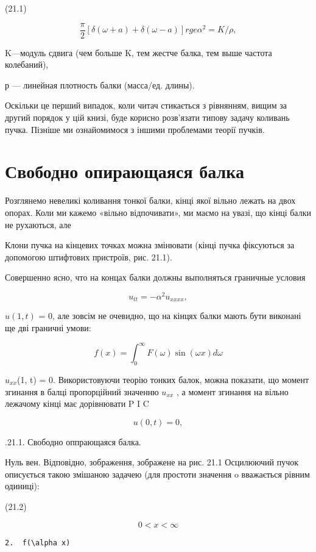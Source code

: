 \documentclass[
  ukrainian,
]{article}
\begin{document}
(21.1)

\[
\frac{\pi}{2} [\delta(\omega+a) + \delta(\omega-a)]
rge  \alpha^2 = K/\rho  ,
\]

K---модуль сдвига (чем больше K, тем жестче балка, тем выше частота
колебаний),

р --- линейная плотность балки (масса/ед. длины).

Оскільки це перший випадок, коли читач стикається з рівнянням, вищим за
другий порядок у цій книзі, буде корисно розв'язати типову задачу
коливань пучка. Пізніше ми ознайомимося з іншими проблемами теорії
пучків.

\section{Свободно опирающаяся
балка}\label{ux441ux432ux43eux431ux43eux434ux43dux43e-ux43eux43fux438ux440ux430ux44eux449ux430ux44fux441ux44f-ux431ux430ux43bux43aux430}

Розглянемо невеликі коливання тонкої балки, кінці якої вільно лежать на
двох опорах. Коли ми кажемо «вільно відпочивати», ми маємо на увазі, що
кінці балки не рухаються, але

Клони пучка на кінцевих точках можна змінювати (кінці пучка фіксуються
за допомогою штифтових пристроїв, рис. 21.1).

Совершенно ясно, что на концах балки должны выполняться граничные
условия

\[
u_{tt} = -\alpha^2 u_{xxxx},
\]

\(u(1, t)\) = 0, але зовсім не очевидно, що на кінцях балки мають бути
виконані ще дві граничні умови:

\[
f(x) = \int_{0}^{\infty} F(\omega) \sin(\omega x) d\omega
\]

\(u_{xx}\)(1, t) = 0. Використовуючи теорію тонких балок, можна
показати, що момент згинання в балці пропорційний значенню \(u_{xx}\) ,
а момент згинання на вільно лежачому кінці має дорівнювати P I C

\[
u(0, t) = 0,
\]

.21.1. Свободно оппрающаяся балка.

Нуль вен. Відповідно, зображення, зображене на рис. 21.1 Осцилюючий
пучок описується такою змішаною задачею (для простоти значення o
вважається рівним одиниці):

(21.2)

\[
0 < x < \infty
\]

\begin{verbatim}
2.  f(\alpha x) 
\end{verbatim}
\end{document}
